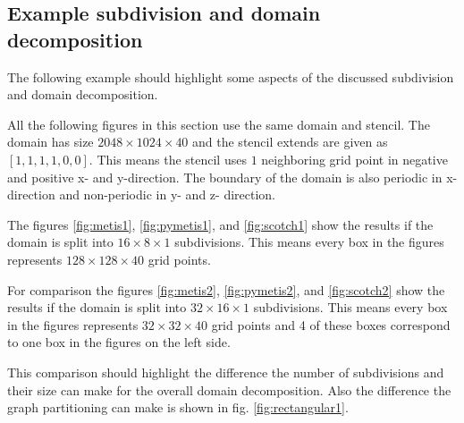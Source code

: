 \subsection{Example subdivision and domain decomposition}
\label{sec:examplesubdivision}
The following example should highlight some aspects of the discussed subdivision and domain decomposition.

All the following figures in this section use the same domain and stencil.
The domain has size $2048 \times 1024 \times 40$ and the stencil extends are given as $\left[1, 1, 1, 1, 0, 0\right]$.
This means the stencil uses $1$ neighboring grid point in negative and positive x- and y-direction.
The boundary of the domain is also periodic in x-direction and non-periodic in y- and z- direction.

The figures \ref{fig:metis1}, \ref{fig:pymetis1}, and \ref{fig:scotch1} show the results if the domain is split into $16 \times 8 \times 1$ subdivisions.
This means every box in the figures represents $128 \times 128 \times 40$ grid points.

For comparison the figures \ref{fig:metis2}, \ref{fig:pymetis2}, and \ref{fig:scotch2} show the results if the domain is split into $32 \times 16 \times 1$ subdivisions.
This means every box in the figures represents $32 \times 32 \times 40$ grid points and 4 of these boxes correspond to one box in the figures on the left side.

This comparison should highlight the difference the number of subdivisions and their size can make for the overall domain decomposition.
Also the difference the graph partitioning can make is shown in fig. \ref{fig:rectangular1}.


